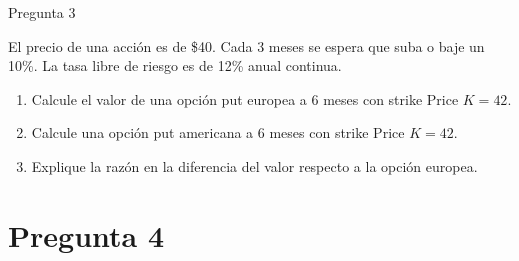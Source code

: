 \documentclass{beamer}
\begin{document}
  
\newcommand{\Pregtres}{
  El precio de una acción es de \$40. Cada 3 meses se espera que suba o baje un 10\%.
  La tasa libre de riesgo es de 12\% anual continua.}
\newcommand{\Pregtresa}{Calcule el valor de una opción put europea a 6 meses con strike Price $K=42$.}
\newcommand{\Pregtresb}{Calcule una opción put americana a 6 meses con strike Price $K=42$.}
\newcommand{\Pregtresc}{Explique la razón en la diferencia del valor respecto a la opción europea.}
\begin{frame}{Pregunta 3}
  \justify
\Pregtres
\vspace{1em}

\begin{enumerate}[label=\textbf{\alph*)}]
  \item \Pregtresa
  \item \Pregtresb
  \item \Pregtresc
\end{enumerate}

\end{frame}
\section{Pregunta 4}
    
\end{document}
